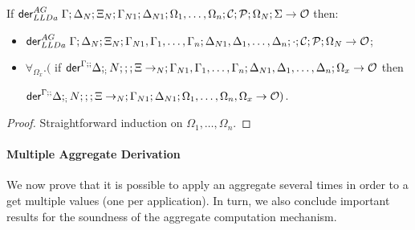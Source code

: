 \begin{theorem}\label{thm:aggregate_derivation}
If $\mathsf{der}_{LLDa}^{AG} \; \Gamma; \Delta_N; \Xi_N; \Gamma_{N1}; \Delta_{N1}; \Omega_1, \dotsc,
   \Omega_n; \mathcal{C}; \mathcal{P}; \Omega_N; \Sigma \rightarrow \mathcal{O}$ then:

\begin{itemize}[leftmargin=*]
   \item $\mathsf{der}_{LLDa}^{AG} \; \Gamma; \Delta_N; \Xi_N; \Gamma_{N1}, \Gamma_1, \dotsc, \Gamma_n; \Delta_{N1},
   \Delta_1, \dotsc, \Delta_n; \cdot; \mathcal{C}; \mathcal{P}; \Omega_N \rightarrow
   \mathcal{O}$;

   \item $\forall_{\Omega_x}.($ if $\mathsf{der}^{\Gamma ; ;} \Delta ; _; N; ;; \Xi \rightarrow _N;
   \Gamma_{N1}, \Gamma_1, \dotsc, \Gamma_n; \Delta_{N1}, \Delta_1, \dotsc,
   \Delta_n; \Omega_x \rightarrow \mathcal{O}$ then

   $\mathsf{der}^{\Gamma ; ;} \Delta ; _; N; ;; \Xi \rightarrow _N; \Gamma_{N1}; \Delta_{N1}; \Omega_1, \dotsc,
   \Omega_n, \Omega_x \rightarrow \mathcal{O})$.

\end{itemize}
\end{theorem}

\begin{proof}
Straightforward induction on $\Omega_1, \dotsc, \Omega_n$.
\end{proof}


\paragraph{Multiple Aggregate Derivation} We now prove that it is possible
to apply an aggregate several times in order to a get multiple values (one per
application). In turn, we also conclude important results for the
soundness of the aggregate computation mechanism.

